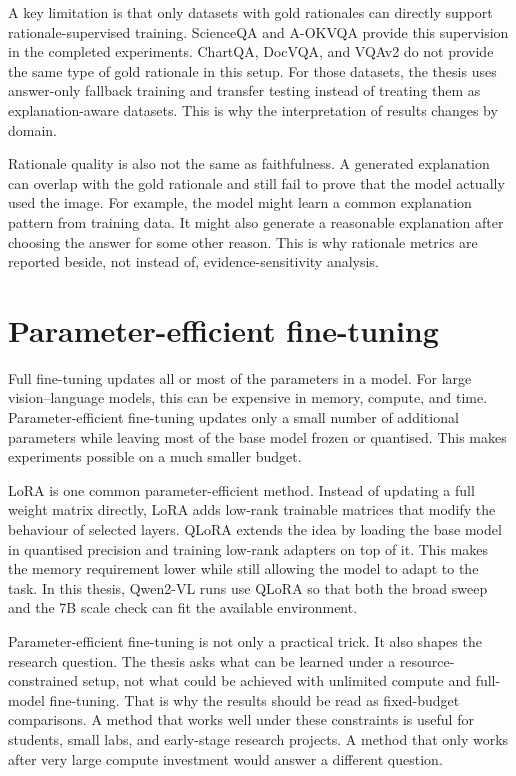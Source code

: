 \documentclass[12pt,bibliography=totoc,listof=totoc,BCOR=5mm,DIV=12,oneside,open=any]{scrbook}
\begin{document}
A key limitation is that only datasets with gold rationales can directly support rationale-supervised training.
ScienceQA and A-OKVQA provide this supervision in the completed experiments.
ChartQA, DocVQA, and VQAv2 do not provide the same type of gold rationale in this setup.
For those datasets, the thesis uses answer-only fallback training and transfer testing instead of treating them as explanation-aware datasets.
This is why the interpretation of results changes by domain.

Rationale quality is also not the same as faithfulness.
A generated explanation can overlap with the gold rationale and still fail to prove that the model actually used the image.
For example, the model might learn a common explanation pattern from training data.
It might also generate a reasonable explanation after choosing the answer for some other reason.
This is why rationale metrics are reported beside, not instead of, evidence-sensitivity analysis.

\section{Parameter-efficient fine-tuning}
Full fine-tuning updates all or most of the parameters in a model.
For large vision--language models, this can be expensive in memory, compute, and time.
Parameter-efficient fine-tuning updates only a small number of additional parameters while leaving most of the base model frozen or quantised.
This makes experiments possible on a much smaller budget.

LoRA is one common parameter-efficient method.
Instead of updating a full weight matrix directly, LoRA adds low-rank trainable matrices that modify the behaviour of selected layers.
QLoRA extends the idea by loading the base model in quantised precision and training low-rank adapters on top of it.
This makes the memory requirement lower while still allowing the model to adapt to the task.
In this thesis, Qwen2-VL runs use QLoRA so that both the broad sweep and the 7B scale check can fit the available environment.

Parameter-efficient fine-tuning is not only a practical trick.
It also shapes the research question.
The thesis asks what can be learned under a resource-constrained setup, not what could be achieved with unlimited compute and full-model fine-tuning.
That is why the results should be read as fixed-budget comparisons.
A method that works well under these constraints is useful for students, small labs, and early-stage research projects.
A method that only works after very large compute investment would answer a different question.
\end{document}
